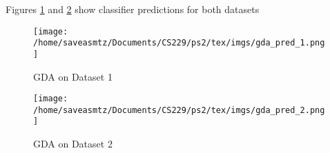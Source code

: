 \begin{answer}
Figures \ref{fig:GDA_pred_1} and \ref{fig:GDA_pred_2} show classifier predictions for both datasets

\begin{figure}
    \centering
    \texttt{[image: /home/saveasmtz/Documents/CS229/ps2/tex/imgs/gda\_pred\_1.png]}
    \caption{GDA on Dataset 1}
    \label{fig:GDA_pred_1}
\end{figure}

\begin{figure}
    \centering
    \texttt{[image: /home/saveasmtz/Documents/CS229/ps2/tex/imgs/gda\_pred\_2.png]}
    \caption{GDA on Dataset 2}
    \label{fig:GDA_pred_2}
\end{figure}

\end{answer}
